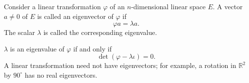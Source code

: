 Consider a linear transformation $\varphi$ of an $n$-dimensional linear space $E$. A vector $a \neq 0$ of $E$ is called an eigenvector of $\varphi$ if
$$\varphi a = \lambda a.$$
The scalar $\lambda$ is called the corresponding eigenvalue.

$\lambda$ is an eigenvalue of $\varphi$ if and only if
$$\det(\varphi - \lambda\iota) = 0.$$
A linear transformation need not have eigenvectors; for example, a rotation in $\mathbb{R}^2$ by $90^\circ$ has no real eigenvectors.

